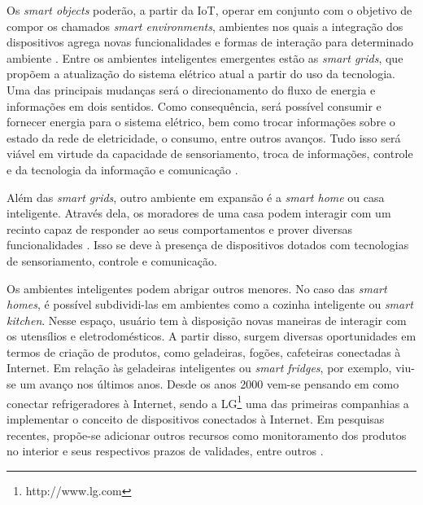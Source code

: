 Os \textit{smart objects} poderão, a partir da IoT, operar em conjunto com o objetivo de compor os chamados \textit{smart environments}, ambientes nos quais a integração dos dispositivos agrega novas funcionalidades e formas de interação para determinado ambiente \cite{Asano2016}. Entre os ambientes inteligentes emergentes estão as \textit{smart grids}, que propõem a atualização do sistema elétrico atual a partir do uso da tecnologia. Uma das principais mudanças será o direcionamento do fluxo de energia e informações em dois sentidos. Como consequência, será possível consumir e fornecer energia para o sistema elétrico, bem como trocar informações sobre o estado da rede de eletricidade, o consumo, entre outros avanços. Tudo isso será viável em virtude da capacidade de sensoriamento, troca de informações, controle e da tecnologia da informação e comunicação \cite{Cecilia2016}.  

Além das \textit{smart grids}, outro ambiente em expansão é a \textit{smart home} ou casa inteligente. Através dela, os moradores de uma casa podem interagir com um recinto capaz de responder ao seus comportamentos e prover diversas funcionalidades \cite{DeSilva2012}. Isso se deve à presença de dispositivos dotados com tecnologias de sensoriamento, controle e comunicação. 

Os ambientes inteligentes podem abrigar outros menores. No caso das \textit{smart homes}, é possível subdividi-las em ambientes como a cozinha inteligente ou \textit{smart kitchen}. Nesse espaço, usuário tem à disposição novas maneiras de interagir com os utensílios e eletrodomésticos. A partir disso, surgem diversas oportunidades em termos de criação de produtos, como geladeiras, fogões, cafeteiras conectadas à Internet. Em relação às geladeiras inteligentes ou \textit{smart fridges}, por exemplo, viu-se um avanço nos últimos anos. Desde os anos 2000 vem-se pensando em como conectar refrigeradores à Internet, sendo a LG\textsuperscript{\textregistered}\footnote{http://www.lg.com} uma das primeiras companhias a implementar o conceito de dispositivos conectados à Internet. Em pesquisas recentes, propõe-se adicionar outros recursos como monitoramento dos produtos no interior e seus respectivos prazos de validades, entre outros \cite{Hachani2016}. 

